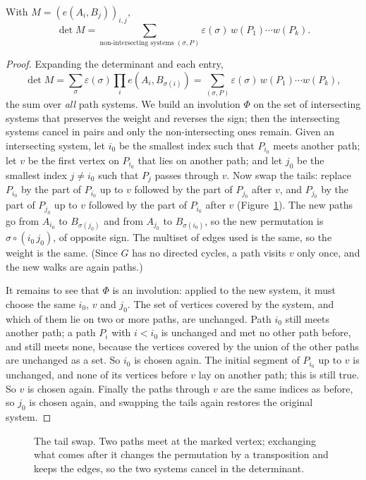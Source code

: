 \begin{theorem}\label{linear:thm:lgv}
With $M=(e(A_i,B_j))_{i,j}$,
\[
\det M=\sum_{\text{non-intersecting systems }(\sigma,P)}\varepsilon(\sigma)\,w(P_1)\cdots w(P_k).
\]
\end{theorem}
\begin{proof}
Expanding the determinant and each entry,
\[
\det M=\sum_\sigma\varepsilon(\sigma)\prod_ie(A_i,B_{\sigma(i)})=\sum_{(\sigma,P)}\varepsilon(\sigma)\,w(P_1)\cdots w(P_k),
\]
the sum over \emph{all} path systems. We build an involution $\Phi$ on the set of intersecting systems that preserves
the weight and reverses the sign; then the intersecting systems cancel in pairs and only the non-intersecting ones
remain. Given an intersecting system, let $i_0$ be the smallest index such that $P_{i_0}$ meets another path; let $v$
be the first vertex on $P_{i_0}$ that lies on another path; and let $j_0$ be the smallest index $j\ne i_0$ such that
$P_j$ passes through $v$. Now swap the tails: replace $P_{i_0}$ by the part of $P_{i_0}$ up to $v$ followed by the part
of $P_{j_0}$ after $v$, and $P_{j_0}$ by the part of $P_{j_0}$ up to $v$ followed by the part of $P_{i_0}$ after $v$
(Figure~\ref{linear:fig:lgv}). The new paths go from $A_{i_0}$ to $B_{\sigma(j_0)}$ and from $A_{j_0}$ to $B_{\sigma(i_0)}$, so the new
permutation is $\sigma\circ(i_0\,j_0)$, of opposite sign. The multiset of edges used is the same, so the weight is the
same. (Since $G$ has no directed cycles, a path visits $v$ only once, and the new walks are again paths.)

It remains to see that $\Phi$ is an involution: applied to the new system, it must choose the same $i_0$, $v$ and
$j_0$. The set of vertices covered by the system, and which of them lie on two or more paths, are unchanged. Path
$i_0$ still meets another path; a path $P_i$ with $i<i_0$ is unchanged and met no other path before, and still meets
none, because the vertices covered by the union of the other paths are unchanged as a set. So $i_0$ is chosen again.
The initial segment of $P_{i_0}$ up to $v$ is unchanged, and none of its vertices before $v$ lay on another path; this is
still true. So $v$ is chosen again. Finally the paths through $v$ are the same indices as before, so $j_0$ is chosen
again, and swapping the tails again restores the original system.
\end{proof}

\begin{figure}[ht]
\centering
{}
\caption{The tail swap. Two paths meet at the marked vertex; exchanging what comes after it changes the permutation by a
transposition and keeps the edges, so the two systems cancel in the determinant.}
\label{linear:fig:lgv}
\end{figure}

